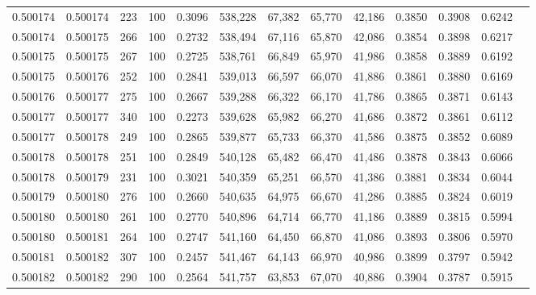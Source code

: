 \begin{tabular}{rrrrrrrrrrrrr}
0.500174 & 0.500174 &   223 & 100 &                                     0.3096 & 538,228 &  67,382 &  65,770 &  42,186 & 0.3850 & 0.3908 & 0.6242 \\
0.500174 & 0.500175 &   266 & 100 &                                     0.2732 & 538,494 &  67,116 &  65,870 &  42,086 & 0.3854 & 0.3898 & 0.6217 \\
0.500175 & 0.500175 &   267 & 100 &                                     0.2725 & 538,761 &  66,849 &  65,970 &  41,986 & 0.3858 & 0.3889 & 0.6192 \\
0.500175 & 0.500176 &   252 & 100 &                                     0.2841 & 539,013 &  66,597 &  66,070 &  41,886 & 0.3861 & 0.3880 & 0.6169 \\
0.500176 & 0.500177 &   275 & 100 &                                     0.2667 & 539,288 &  66,322 &  66,170 &  41,786 & 0.3865 & 0.3871 & 0.6143 \\
0.500177 & 0.500177 &   340 & 100 &                                     0.2273 & 539,628 &  65,982 &  66,270 &  41,686 & 0.3872 & 0.3861 & 0.6112 \\
0.500177 & 0.500178 &   249 & 100 &                                     0.2865 & 539,877 &  65,733 &  66,370 &  41,586 & 0.3875 & 0.3852 & 0.6089 \\
0.500178 & 0.500178 &   251 & 100 &                                     0.2849 & 540,128 &  65,482 &  66,470 &  41,486 & 0.3878 & 0.3843 & 0.6066 \\
0.500178 & 0.500179 &   231 & 100 &                                     0.3021 & 540,359 &  65,251 &  66,570 &  41,386 & 0.3881 & 0.3834 & 0.6044 \\
0.500179 & 0.500180 &   276 & 100 &                                     0.2660 & 540,635 &  64,975 &  66,670 &  41,286 & 0.3885 & 0.3824 & 0.6019 \\
0.500180 & 0.500180 &   261 & 100 &                                     0.2770 & 540,896 &  64,714 &  66,770 &  41,186 & 0.3889 & 0.3815 & 0.5994 \\
0.500180 & 0.500181 &   264 & 100 &                                     0.2747 & 541,160 &  64,450 &  66,870 &  41,086 & 0.3893 & 0.3806 & 0.5970 \\
0.500181 & 0.500182 &   307 & 100 &                                     0.2457 & 541,467 &  64,143 &  66,970 &  40,986 & 0.3899 & 0.3797 & 0.5942 \\
0.500182 & 0.500182 &   290 & 100 &                                     0.2564 & 541,757 &  63,853 &  67,070 &  40,886 & 0.3904 & 0.3787 & 0.5915 \\

\end{tabular}
